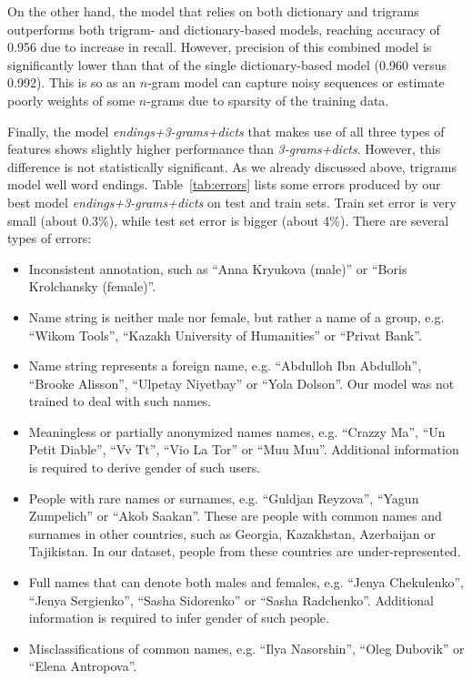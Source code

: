 \documentclass[runningheads,a4paper]{llncs}
\newenvironment{itemize2}
       {\begin{itemize}
                \vspace{-0.25em}
                 \setlength{\abovedisplayskip}{0pt}
                 \setlength{\belowdisplayskip}{0pt}
                 \setlength{\itemsep}{4pt}
                 \setlength{\parskip}{0pt}
                 \setlength{\parsep}{0pt}
                 \setlength{\topsep}{0pt}
                 \setlength{\partopsep}{0pt}
         }
         {\vspace{-0.25em}
         \end{itemize}}
\begin{document}
On the other hand, the model that relies on both dictionary and trigrams outperforms both trigram- and dictionary-based models, reaching accuracy of 0.956 due to increase in recall. However, precision of this combined model is significantly lower than that of the single dictionary-based model (0.960 versus 0.992). This is so as an $n$-gram model can capture noisy sequences or estimate poorly weights of some $n$-grams due to sparsity of the training data. 

Finally, the model \textit{endings+3-grams+dicts}  that makes use of all three types of features shows slightly higher performance than \textit{3-grams+dicts}.  However, this difference is not statistically significant. As we already discussed above, trigrams model well word endings. Table~\ref{tab:errors} lists some errors produced by our best model \textit{endings+3-grams+dicts} on test and train sets. Train set error is very small (about 0.3\%), while test set error is bigger (about 4\%). There are several types of errors: 

\begin{itemize2}
\item Inconsistent annotation, such as ``Anna Kryukova (male)'' or ``Boris Krolchansky (female)''. 

\item Name string is neither male nor female, but rather a name of a group, e.g. ``Wikom Tools'', ``Kazakh University of Humanities'' or ``Privat Bank''.

\item Name string represents a foreign name, e.g. ``Abdulloh Ibn Abdulloh'', ``Brooke Alisson'', ``Ulpetay Niyetbay'' or ``Yola Dolson''. Our model was not trained to deal with such names. 

\item Meaningless or partially anonymized names names, e.g. ``Crazzy Ma'', ``Un Petit Diable'', ``Vv Tt'', ``Vio La Tor'' or ``Muu Muu''. Additional information is required to derive gender of such users.

\item People with rare names or surnames, e.g. ``Guldjan Reyzova'',  ``Yagun Zumpelich'' or ``Akob Saakan''. These are people with common names and surnames in other countries, such as Georgia, Kazakhstan, Azerbaijan or Tajikistan. In our dataset, people from these countries are under-represented. 

\item Full names that can denote both males and females, e.g. ``Jenya Chekulenko'', ``Jenya Sergienko'', ``Sasha Sidorenko'' or ``Sasha Radchenko''. Additional information is required to infer gender of such people.

\item Misclassifications of common names, e.g. ``Ilya Nasorshin'', ``Oleg Dubovik'' or ``Elena Antropova''. 


\end{itemize2}
\end{document}
